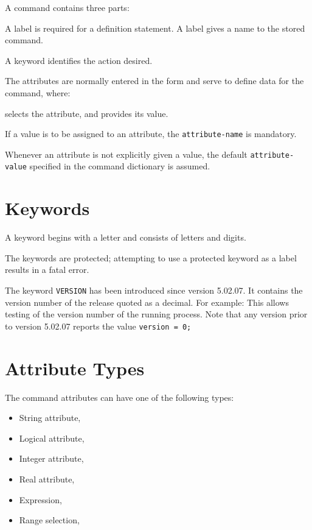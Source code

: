 A command contains three parts:
\begin{madlist}
   A label is required for a definition statement. 
   A label gives a name to the stored command.
     
   A keyword identifies the action desired.
     
   The attributes are normally entered in the
   form 
   and serve to define data for the command, where:
   \begin{madlist}
        selects the attribute, and
        provides its value.       
   \end{madlist}
\end{madlist}

If a value is to be assigned to an attribute, the \texttt{attribute-name} is
mandatory.

Whenever an attribute is not explicitly given a value, the default 
\texttt{attribute-value} specified in the command dictionary is assumed. 


\section{Keywords}
\label{subsec:keyword}

A keyword begins with a letter and consists of letters and digits. 

The \madx keywords are protected; attempting to use a protected 
keyword as a label results in a fatal error.

The keyword \texttt{VERSION} has been introduced since version 5.02.07. 
It contains the version number of the \madx release quoted as a decimal.
For example:
This allows testing of the version number of the running \madx process. 
Note that any version prior to version 5.02.07 reports the value 
\texttt{version = 0;}


\section{Attribute Types}
The command attributes can have one of the following types:
\begin{itemize}
  \item String attribute,
  \item Logical attribute,
  \item Integer attribute,
  \item Real attribute,
  \item Expression,
  \item Range selection,
\end{itemize}


